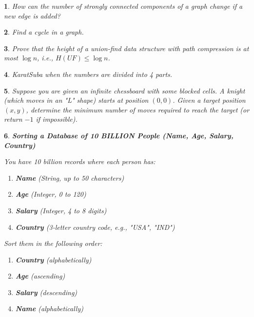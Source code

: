 \documentclass[%
addpoints]{exam}
\theoremstyle{problem}
\newtheorem{p}{}
\begin{document}
\begin{p} 
How can the number of strongly connected components of a graph change if a new edge is added?  
\hfill  
\end{p}

\begin{p}
Find a cycle in a graph.  
\hfill
\end{p}

\begin{p}
Prove that the height of a union-find data structure with path compression is at most $\log n$, i.e., $H(UF) \leq \log n$.  
\hfill
\end{p}

\begin{p}
KaratSuba when the numbers are divided into 4 parts.
\hfill\end{p}

\begin{p}
Suppose you are given an infinite chessboard with some blocked cells. A knight (which moves in an "L" shape) starts at position $(0,0)$. Given a target position $(x, y)$, determine the minimum number of moves required to reach the target (or return $-1$ if impossible).
\hfill\end{p}

\begin{p}
\textbf{Sorting a Database of 10 BILLION People (Name, Age, Salary, Country)}

You have 10 billion records where each person has:

\begin{enumerate}
    \item \textbf{Name} (String, up to 50 characters)
    \item \textbf{Age} (Integer, 0 to 120)
    \item \textbf{Salary} (Integer, 4 to 8 digits)
    \item \textbf{Country} (3-letter country code, e.g., "USA", "IND")
\end{enumerate}

Sort them in the following order:

\begin{enumerate}
    \item[\textcircled{1}] \textbf{Country} (alphabetically)
    \item[\textcircled{2}] \textbf{Age} (ascending)
    \item[\textcircled{3}] \textbf{Salary} (descending)
    \item[\textcircled{4}] \textbf{Name} (alphabetically)
\end{enumerate}
\hfill\end{p}
\end{document}
